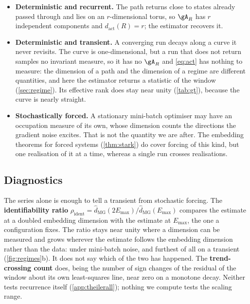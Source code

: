 \documentclass[twoside]{article}
\begin{document}
\begin{itemize}[leftmargin=1.2em, itemsep=2pt, topsep=3pt, parsep=0pt]
\item \textbf{Deterministic and recurrent.} The path returns close to states already passed through
and lies on an $r$-dimensional torus, so $\gA_R$ has $r$ independent components and
$d_{\mathrm{act}}(R) = r$; the estimator recovers it.

\item \textbf{Deterministic and transient.} A converging run decays along a curve it never
revisits. The curve is one-dimensional, but a run that does not return samples no invariant
measure, so it has no $\gA_R$ and \cref{eq:act} has nothing to measure: the dimension of a path and
the dimension of a regime are different quantities, and here the estimator returns a statistic of
the window (\cref{sec:regime}). Its effective rank does stay near unity (\cref{tab:gt}), because
the curve is nearly straight.

\item \textbf{Stochastically forced.} A stationary mini-batch optimiser may have an occupation
measure of its own, whose dimension counts the directions the gradient noise excites. That is not
the quantity we are after. The embedding theorems for forced systems (\cref{thm:stark})
do cover forcing of this kind, but one realisation of it at a time, whereas a single run crosses
realisations.
\end{itemize}

\subsection{Diagnostics}\label{sec:diagnostics}

The series alone is enough to tell a transient from stochastic forcing. The \textbf{identifiability
ratio} $\rho_{\mathrm{ident}} = \hat{d}_{\mathrm{MG}}(2E_{\max}) / \hat{d}_{\mathrm{MG}}(E_{\max})$
compares the estimate at a doubled embedding dimension with the estimate at $E_{\max}$, the one a
configuration fixes. The ratio stays near unity where a
dimension can be measured and grows wherever the estimate follows the embedding dimension rather
than the data: under mini-batch noise, and furthest of all on a transient (\cref{fig:regimes}b).
It does not say which of the two has happened. The \textbf{trend-crossing count} does, being the
number of sign changes of the residual of the window about its own least-squares line, near zero on
a monotone decay. Neither tests recurrence itself (\cref{app:theilerall}); nothing we compute
tests the scaling range.
\end{document}
